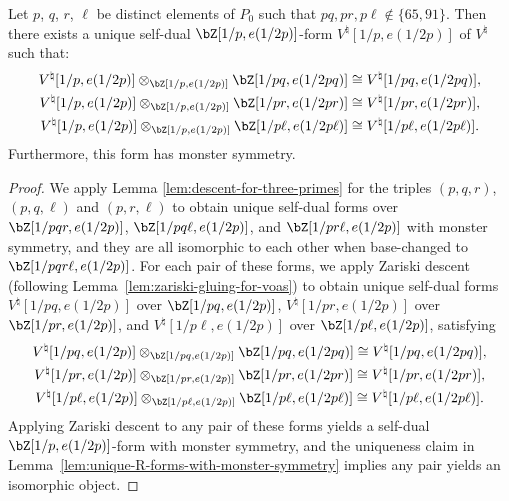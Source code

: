 \begin{lem} \label{lem:descent-for-tripod}Let $p$, $q$, $r$, $\ell$ be distinct elements of $P_0$ such that $pq, pr, p\ell \not\in \{65, 91\}$. Then there exists a unique self-dual $\bZ[1/p, e(1/2p)]$-form $V^\natural[1/p, e(1/2p)]$ of $V^\natural$ such that:{\samepage
\begin{gather*}
V^\natural[1/p, e(1/2p)] \otimes_{\bZ[1/p, e(1/2p)]} \bZ[1/pq, e(1/2pq)]\cong V^\natural[1/pq, e(1/2pq)], \\
V^\natural[1/p, e(1/2p)] \otimes_{\bZ[1/p, e(1/2p)]} \bZ[1/pr, e(1/2pr)]\cong V^\natural[1/pr, e(1/2pr)], \\
V^\natural[1/p, e(1/2p)] \otimes_{\bZ[1/p, e(1/2p)]} \bZ[1/p\ell, e(1/2p\ell)]\cong V^\natural[1/p\ell, e(1/2p\ell)].
\end{gather*}
Furthermore, this form has monster symmetry.}
\end{lem}
\begin{proof}We apply Lemma \ref{lem:descent-for-three-primes} for the triples $(p,q,r)$, $(p,q,\ell)$ and $(p,r,\ell)$ to obtain unique self-dual forms over $\bZ[1/pqr, e(1/2p)]$, $\bZ[1/pq\ell, e(1/2p)]$, and $\bZ[1/pr\ell, e(1/2p)]$ with monster symmetry, and they are all isomorphic to each other when base-changed to $\bZ[1/pqr\ell, e(1/2p)]$. For each pair of these forms, we apply Zariski descent (following Lemma~\ref{lem:zariski-gluing-for-voas}) to obtain unique self-dual forms $V^\natural[1/pq, e(1/2p)]$ over $\bZ[1/pq, e(1/2p)]$, $V^\natural[1/pr, e(1/2p)]$ over $\bZ[1/pr, e(1/2p)]$, and $V^\natural[1/p\ell, e(1/2p)]$ over $\bZ[1/p\ell, e(1/2p)]$, satisfying
\begin{gather*}
V^\natural[1/pq, e(1/2p)] \otimes_{\bZ[1/pq, e(1/2p)]} \bZ[1/pq, e(1/2pq)] \cong V^\natural[1/pq, e(1/2pq)], \\
V^\natural[1/pr, e(1/2p)] \otimes_{\bZ[1/pr, e(1/2p)]} \bZ[1/pr, e(1/2pr)]\cong V^\natural[1/pr, e(1/2pr)], \\
V^\natural[1/p\ell, e(1/2p)] \otimes_{\bZ[1/p\ell, e(1/2p)]} \bZ[1/p\ell, e(1/2p\ell)]\cong V^\natural[1/p\ell, e(1/2p\ell)].
\end{gather*}
Applying Zariski descent to any pair of these forms yields a self-dual $\bZ[1/p, e(1/2p)]$-form with monster symmetry, and the uniqueness claim in Lemma~\ref{lem:unique-R-forms-with-monster-symmetry} implies any pair yields an isomorphic object.
\end{proof}

